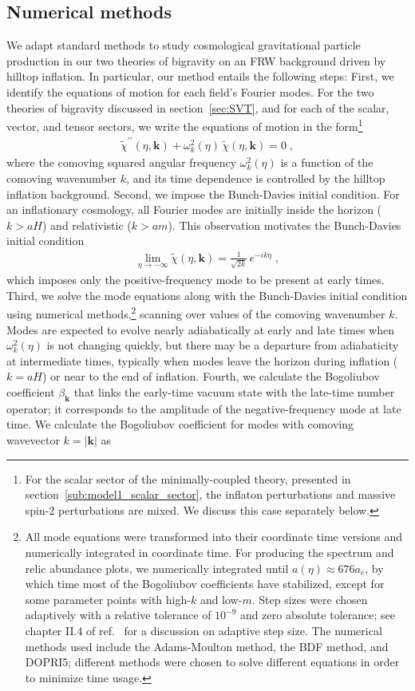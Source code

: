 \documentclass[11pt,a4paper]{article}
\newcommand{\ba}[1]{\begin{align} #1 \end{align}}
\newcommand{\kvec}{{\bm k}}
\newcommand{\sref}[1]{section~\ref{#1}}
\newcommand{\rref}[1]{ref.~\cite{#1}}
\begin{document}
\subsection{Numerical methods}
\label{sub:numerical_methods}

We adapt standard methods to study cosmological gravitational particle production in our two theories of bigravity on an FRW background driven by hilltop inflation.  In particular, our method entails the following steps:  First, we identify the equations of motion for each field's Fourier modes.  For the two theories of bigravity discussed in \sref{sec:SVT}, and for each of the scalar, vector, and tensor sectors, we write the equations of motion in the form\footnote{For the scalar sector of the minimally-coupled theory, presented in \sref{sub:model1_scalar_sector}, the inflaton perturbations and massive spin-2 perturbations are mixed.  We discuss this case separately below.  }
\ba{
	\tilde{\chi}^{\prime\prime}(\eta,\kvec) + \omega_k^2(\eta) \, \tilde{\chi}(\eta,\kvec) = 0 
	\;,
}
where the comoving squared angular frequency $\omega_k^2(\eta)$ is a function of the comoving wavenumber $k$, and its time dependence is controlled by the hilltop inflation background.  Second, we impose the Bunch-Davies initial condition.  For an inflationary cosmology, all Fourier modes are initially inside the horizon ($k > aH$) and relativistic ($k > am$).  This observation motivates the Bunch-Davies initial condition 
\ba{\label{eq:bd_condition}
	\lim_{\eta \to -\infty} \tilde{\chi}(\eta,\kvec) = \frac{1}{\sqrt{2k}} \, e^{-i k \eta} 
	\;,
}
which imposes only the positive-frequency mode to be present at early times.  Third, we solve the mode equations along with the Bunch-Davies initial condition using numerical methods,\footnote{All mode equations were transformed into their coordinate time versions and numerically integrated in coordinate time. For producing the spectrum and relic abundance plots, we numerically integrated until $a(\eta) \approx 676 a_e$, by which time most of the Bogoliubov coefficients have stabilized, except for some parameter points with high-$k$ and low-$m$. Step sizes were chosen adaptively with a relative tolerance of $10^{-9}$ and zero absolute tolerance; see chapter II.4 of \rref{hairer_norsett_wanner_2009} for a discussion on adaptive step size. The numerical methods used include the Adams-Moulton method, the BDF method, and DOPRI5; different methods were chosen to solve different equations in order to minimize time usage. }   scanning over values of the comoving wavenumber $k$.  Modes are expected to evolve nearly adiabatically at early and late times when $\omega_k^2(\eta)$ is not changing quickly, but there may be a departure from adiabaticity at intermediate times, typically when modes leave the horizon during inflation ($k = aH$) or near to the end of inflation.  Fourth, we calculate the Bogoliubov coefficient $\beta_\kvec$ that links the early-time vacuum state with the late-time number operator; it corresponds to the amplitude of the negative-frequency mode at late time.  We calculate the Bogoliubov coefficient for modes with comoving wavevector $k=|\kvec|$ as 
\end{document}
